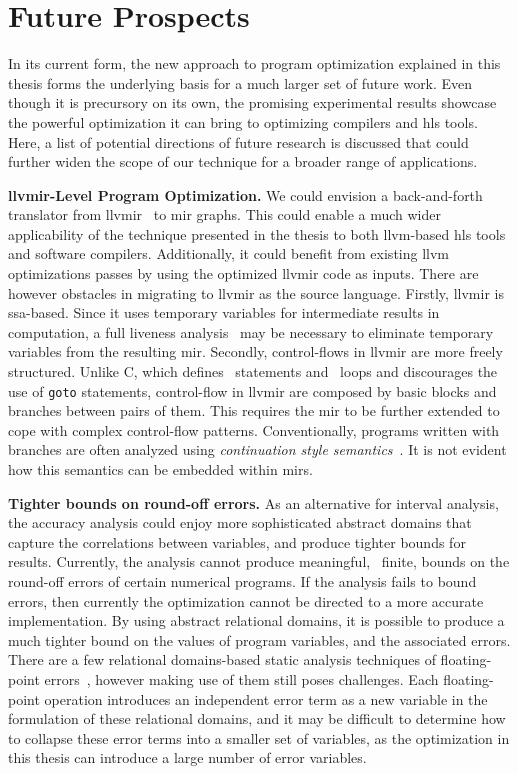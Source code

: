 \section{Future Prospects}
\label{cc:sec:future_prospects}

In its current form, the new approach to program optimization explained in this
thesis forms the underlying basis for a much larger set of future work.  Even
though it is precursory on its own, the promising experimental results showcase
the powerful optimization it can bring to optimizing compilers and \gls{hls}
tools.  Here, a list of potential directions of future research is discussed
that could further widen the scope of our technique for a broader range of
applications.

\textbf{\gls{llvmir}-Level Program Optimization.}  We could envision
a back-and-forth translator from \gls{llvmir}~\cite{llvm, llvm_ir} to
\gls{mir} graphs.  This could enable a much wider applicability of the
technique presented in the thesis to both \gls{llvm}-based \gls{hls} tools
and software compilers.  Additionally, it could benefit from existing
\gls{llvm} optimizations passes by using the optimized \gls{llvmir} code
as inputs.  There are however obstacles in migrating to \gls{llvmir} as
the source language.  Firstly, \gls{llvmir} is \gls{ssa}-based.  Since it
uses temporary variables for intermediate results in computation, a full
liveness analysis~\cite{hathhorn12, nielson99, boissinot08} may be necessary
to eliminate temporary variables from the resulting \gls{mir}\@.  Secondly,
control-flows in \gls{llvmir} are more freely structured.  Unlike C, which
defines \iflit~statements and \whilelit~loops and discourages the use of
\verb|goto| statements, control-flow in \gls{llvmir} are composed by basic
blocks and branches between pairs of them.  This requires the \gls{mir} to be
further extended to cope with complex control-flow patterns.  Conventionally,
programs written with branches are often analyzed using \emph{continuation
style semantics}~\cite{felleisen88}.  It is not evident how this semantics can
be embedded within \glspl{mir}.

\textbf{Tighter bounds on round-off errors.} As an alternative for interval
analysis, the accuracy analysis could enjoy more sophisticated abstract domains
that capture the correlations between variables, and produce tighter bounds
for results.  Currently, the analysis cannot produce meaningful, \ie~finite,
bounds on the round-off errors of certain numerical programs.  If the analysis
fails to bound errors, then currently the optimization cannot be directed
to a more accurate implementation.  By using abstract relational domains,
it is possible to produce a much tighter bound on the values of program
variables, and the associated errors.  There are a few relational domains-based
static analysis techniques of floating-point errors~\cite{mine07_2, putot04,
goubault11, astree}, however making use of them still poses challenges.  Each
floating-point operation introduces an independent error term as a new variable
in the formulation of these relational domains, and it may be difficult to
determine how to collapse these error terms into a smaller set of variables,
as the optimization in this thesis can introduce a large number of error
variables.

